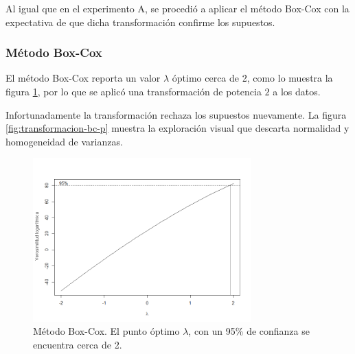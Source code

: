 Al igual que en el experimento A, se procedió a aplicar el método Box-Cox con la expectativa de que dicha transformación confirme los supuestos.

\subsubsection{Método Box-Cox}

El método Box-Cox reporta un valor $\lambda$ óptimo cerca de 2, como lo muestra la figura \ref{fig:box-cox-p}, por lo que se aplicó una transformación de potencia $2$ a los datos.

Infortunadamente la transformación rechaza los supuestos nuevamente. La figura \ref{fig:transformacion-bc-p} muestra la exploración visual que descarta normalidad y homogeneidad de varianzas.

\begin{figure}[H]
    \centering
    \includegraphics[width=0.75\textwidth]{images/p/box-cox-p.png}
    \caption{Método Box-Cox. El punto óptimo $\lambda$, con un 95\% de confianza se encuentra cerca de 2.}
    \label{fig:box-cox-p}
\end{figure}


